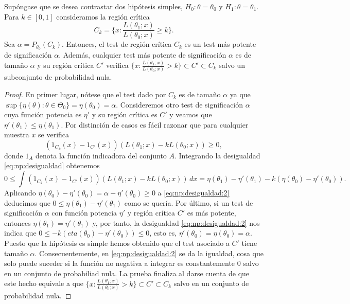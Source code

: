     \begin{thm} \label{thm:np:1}
        Supóngase que se desea contrastar dos hipótesis simples, $H_0 : \theta = \theta_0$ y $H_1 : \theta = \theta_1$. Para $k \in [0,1]$ consideramos la región crítica
        \[C_k = \{x: \frac{L(\theta_1;x)}{L(\theta_0;x)} \ge k\}.\]
        Sea $\alpha = P_{\theta_0}(C_k)$. Entonces, el test de región crítica $C_k$ es un test más potente de significación $\alpha$. Además, cualquier test más potente de significación $\alpha$ es de tamaño $\alpha$ y su región crítica $C'$ verifica $\{x: \frac{L(\theta_1;x)}{L(\theta_0;x)} > k\} \subset C' \subset C_k$ salvo un subconjunto de probabilidad nula.
    \end{thm}
    \begin{proof}
        En primer lugar, nótese que el test dado por $C_k$ es de tamaño $\alpha$ ya que $\sup\{ \eta(\theta) : \theta \in \Theta_0\} = \eta(\theta_0) = \alpha$. Consideremos otro test de significación $\alpha$ cuya función potencia es $\eta'$ y su región crítica es $C'$ y veamos que $\eta'(\theta_1) \le \eta(\theta_1)$. Por distinción de casos es fácil razonar que para cualquier muestra $x$ se verifica
        \begin{equation} \label{eq:np:desigualdad}
            (1_{C_k}(x)-1_{C'}(x)) (L(\theta_1; x) - k L(\theta_0; x)) \ge 0,
        \end{equation}
        donde $1_A$ denota la función indicadora del conjunto $A$. Integrando la desigualdad \eqref{eq:np:desigualdad} obtenemos
        \begin{equation} \label{eq:np:desigualdad:2}
            0 \le \int(1_{C_k}(x)-1_{C'}(x)) (L(\theta_1; x) - k L(\theta_0; x)) \, dx = \eta(\theta_1) - \eta'(\theta_1) - k (\eta(\theta_0) - \eta'(\theta_0)).
        \end{equation}
        Aplicando $\eta(\theta_0) - \eta'(\theta_0) = \alpha  - \eta'(\theta_0) \ge 0$ a \eqref{eq:np:desigualdad:2} deducimos que $0 \le \eta(\theta_1) - \eta'(\theta_1)$ como se quería. Por último, si un test de significación $\alpha$ con función potencia $\eta'$ y región crítica $C'$ es más potente, entonces $\eta(\theta_1) = \eta'(\theta_1)$ y, por tanto, la desigualdad \eqref{eq:np:desigualdad:2} nos indica que $0 \le -k(eta(\theta_0) - \eta'(\theta_0)) \le 0$, esto es, $\eta'(\theta_0) = \eta(\theta_0) = \alpha$. Puesto que la hipótesis es simple hemos obtenido que el test asociado a $C'$ tiene tamaño $\alpha$. Consecuentemente, en \eqref{eq:np:desigualdad:2} se da la igualdad, cosa que solo puede suceder si la función no negativa a integrar es constantemente 0 salvo en un conjunto de probabiliad nula. La prueba finaliza al darse cuenta de que este hecho equivale a que $\{x: \frac{L(\theta_1;x)}{L(\theta_0;x)} > k\} \subset C' \subset C_k$ salvo en un conjunto de probabilidad nula.
    \end{proof}


